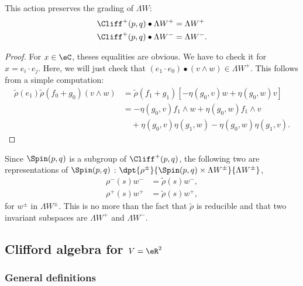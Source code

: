\begin{proposition}
	This action preserves the grading of $\Lambda W $:
	\begin{equation}
		\begin{split}
			\Cliff^+(p,q)\bullet\Lambda W^+&=\Lambda W^+\\
			\Cliff^+(p,q)\bullet\Lambda W^-&=\Lambda W^-.
		\end{split}
	\end{equation}

\end{proposition}
\begin{proof}
	For $x\in\eC$, theses equalities are obvious. We have to check it for $x=e_i\cdot e_j$. Here, we will just check that $(e_1\cdot e_0)\bullet(v\wedge w)\in\Lambda W^+$. This follows from a simple computation:
	\begin{equation}
		\begin{split}
			\tilde\rho(e_1)\tilde\rho(f_0+g_0)(v\wedge w)&=
			\tilde\rho(f_1+g_1)\left[-\eta(g_0,v)w+\eta(g_0,w)v\right]\\
			&=-\eta(g_0,v)f_1\wedge w+\eta(g_0,w)f_1\wedge v\\
			&\quad+\eta(g_0,v)\eta(g_1,w)-\eta(g_0,w)\eta(g_1,v).
		\end{split}
	\end{equation}
\end{proof}

Since $\Spin(p,q)$ is a subgroup of $\Cliff^+(p,q)$, the following two are representations of \( \Spin(p,q)\) : $\dpt{\rho^{\pm}}{\Spin(p,q)\times\Lambda W ^{\pm}}{\Lambda W ^{\pm}}$,
\begin{equation}
	\begin{split}
		\rho^-(s)w^-&=\tilde\rho(s)w^-,\\
		\rho^+(s)w^+&=\tilde\rho(s)w^+,
	\end{split}
\end{equation}
for $w^{\pm}$ in $\Lambda W ^{\pm}$. This is no more than the fact that $\tilde\rho$ is reducible and that two invariant subspaces are $\Lambda W^+$ and $\Lambda W^-$.
\subsection{Clifford algebra for \texorpdfstring{$V=\eR^2$}{V=R2}}\label{cliffR2}

\subsubsection{General definitions}

